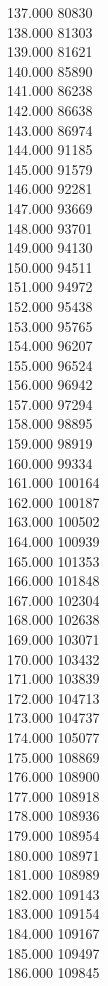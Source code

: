 { 137.000	80830 \\
 138.000	81303 \\
 139.000	81621 \\
 140.000	85890 \\
 141.000	86238 \\
 142.000	86638 \\
 143.000	86974 \\
 144.000	91185 \\
 145.000	91579 \\
 146.000	92281 \\
 147.000	93669 \\
 148.000	93701 \\
 149.000	94130 \\
 150.000	94511 \\
 151.000	94972 \\
 152.000	95438 \\
 153.000	95765 \\
 154.000	96207 \\
 155.000	96524 \\
 156.000	96942 \\
 157.000	97294 \\
 158.000	98895 \\
 159.000	98919 \\
 160.000	99334 \\
 161.000	100164 \\
 162.000	100187 \\
 163.000	100502 \\
 164.000	100939 \\
 165.000	101353 \\
 166.000	101848 \\
 167.000	102304 \\
 168.000	102638 \\
 169.000	103071 \\
 170.000	103432 \\
 171.000	103839 \\
 172.000	104713 \\
 173.000	104737 \\
 174.000	105077 \\
 175.000	108869 \\
 176.000	108900 \\
 177.000	108918 \\
 178.000	108936 \\
 179.000	108954 \\
 180.000	108971 \\
 181.000	108989 \\
 182.000	109143 \\
 183.000	109154 \\
 184.000	109167 \\
 185.000	109497 \\
 186.000	109845 \\
}

